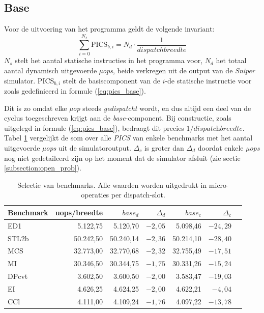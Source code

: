 \documentclass[12pt,a4paper,faculty=ea,language=nl]{ugent-doc}
\begin{document}
\subsection{Base}
Voor de uitvoering van het programma geldt de volgende invariant:
\begin{equation}
\sum_{i=0}^{N_s} \text{PICS}_{b,i} = N_d \cdot \frac{1}{dispatchbreedte}
\label{eq:pics_invariant}
\end{equation}
$N_s$ stelt het aantal statische instructies in het programma voor, $N_d$ het totaal aantal dynamisch uitgevoerde \textit{µops}, beide verkregen uit de output van de \textit{Sniper} simulator. $\text{PICS}_{b,i}$ stelt de basiscomponent van de $i$-de statische instructie voor zoals gedefinieerd in formule (\ref{eq:pics_base}).

Dit is zo omdat elke \textit{µop} steeds \textit{gedispatcht} wordt, en dus altijd een deel van de cyclus toegeschreven krijgt aan de \textit{base}-component. Bij constructie, zoals uitgelegd in formule (\ref{eq:pics_base}), bedraagt dit precies \(1/\textit{dispatchbreedte}\). Tabel \ref{tab:invariant_base} vergelijkt de som over alle \textit{PICS} van enkele benchmarks met het aantal uitgevoerde \textit{µops} uit de simulatoroutput. \(\Delta_c\) is groter dan \(\Delta_d\) doordat enkele \textit{µops} nog niet gedetaileerd zijn op het moment dat de simulator afsluit (zie sectie \ref{subsection:open_prob}).

\begin{table}[H]
    \centering
    \begin{tabular}{lrrrrrr}
        \hline
        Benchmark & uops/breedte & \(base_d\) & \(\Delta_d\) & \(base_c\) & \(\Delta_c\) \\
        \hline
        ED1   &  5.122,75 &  5.120,70 & \(-2,05\) &  5.098,46 & \(-24,29\) \\
        STL2b & 50.242,50 & 50.240,14 & \(-2,36\) & 50.214,10 & \(-28,40\) \\
        MCS   & 32.773,00 & 32.770,68 & \(-2,32\) & 32.755,49 & \(-17,51\) \\
        MI    & 30.346,50 & 30.344,75 & \(-1,75\) & 30.331,26 & \(-15,24\) \\
        DPcvt &  3.602,50 &  3.600,50 & \(-2,00\) &  3.583,47 & \(-19,03\) \\
        EI    &  4.626,25 &  4.624,25 & \(-2,00\) &  4.622,21 &  \(-4,04\) \\
        CCl   &  4.111,00 &  4.109,24 & \(-1,76\) &  4.097,22 & \(-13,78\) \\
        \hline
    \end{tabular}
    \caption{Selectie van benchmarks. Alle waarden worden uitgedrukt in micro-operaties per dispatch-slot.}
    \label{tab:invariant_base}
\end{table}
\end{document}
